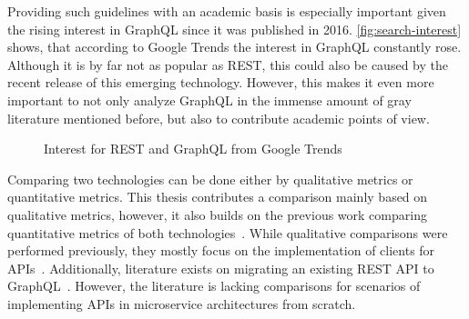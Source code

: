 
Providing such guidelines with an academic basis is especially important given the rising interest in GraphQL since it was published in 2016.
\autoref{fig:search-interest} shows, that according to Google Trends the interest in GraphQL constantly rose.
Although it is by far not as popular as \ac{REST}, this could also be caused by the recent release of this emerging technology.
However, this makes it even more important to not only analyze GraphQL in the immense amount of gray literature mentioned before, but also to contribute academic points of view.

\begin{figure}[h!]
    \centering
    \caption{Interest for \acs{REST} and GraphQL from Google Trends}\label{fig:search-interest}    
\end{figure}

Comparing two technologies can be done either by qualitative metrics or quantitative metrics.
This thesis contributes a comparison mainly based on qualitative metrics, however, it also builds on the previous work comparing quantitative metrics of both technologies~\cite{Brito2019,Brito2020,Wittern2018,Seabra2019}.
While qualitative comparisons were performed previously, they mostly focus on the implementation of clients for \acp{API}~\cite{Brito2020}.
Additionally, literature exists on migrating an existing \ac{REST} \ac{API} to GraphQL~\cite{Vogel2017, Lama2019, Wittern2018}.
However, the literature is lacking comparisons for scenarios of implementing \acp{API} in microservice architectures from scratch.

